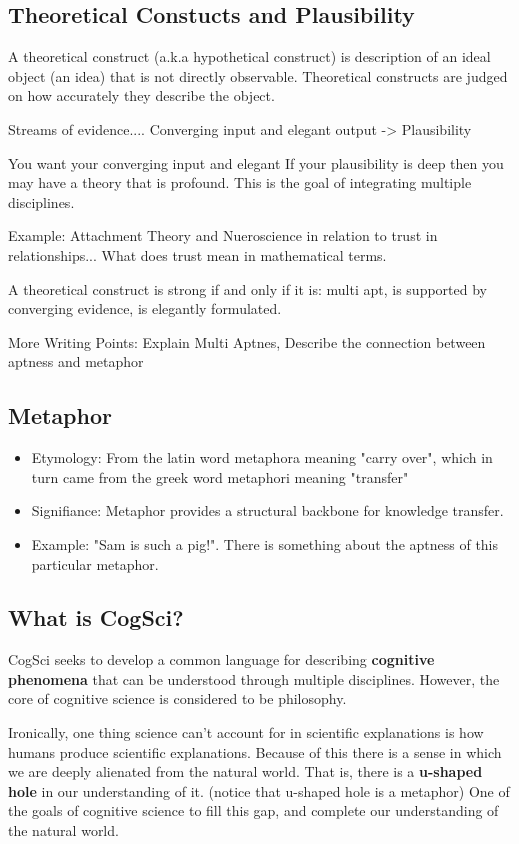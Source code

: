 \documentclass[twoside]{article}
\begin{document}
\subsection{Theoretical Constucts and Plausibility}

A theoretical construct (a.k.a hypothetical construct) is description of
an ideal object (an idea) that is not directly observable. Theoretical constructs
are judged on how accurately they describe the object.

Streams of evidence....
Converging input and elegant output -> Plausibility

You want your converging input and elegant
If your plausibility is deep then you may have a theory that is profound. This is
the goal of integrating multiple disciplines.

Example: Attachment Theory and Nueroscience in relation to trust in relationships...
What does trust mean in mathematical terms.

A theoretical construct is strong if and only if it is: multi apt, is supported by converging evidence, is
elegantly formulated.

More Writing Points: Explain Multi Aptnes, Describe the connection between aptness
and metaphor

\subsection{Metaphor}
\begin{itemize}
  \item Etymology: From the latin word metaphora meaning "carry over", which in turn
  came from the greek word metaphori meaning "transfer"
  \item Signifiance: Metaphor provides a structural backbone for knowledge transfer.
  \item Example: "Sam is such a pig!". There is something about the aptness
  of this particular metaphor.
\end{itemize}

\subsection{What is CogSci?}
CogSci seeks to develop a common language for describing \textbf{cognitive phenomena}
that can be understood through multiple disciplines. However, the core of cognitive
science is considered to be philosophy.

Ironically, one thing science can't account for in scientific explanations is how
humans produce scientific explanations. Because of this there is a sense in which we are deeply
alienated from the natural world. That is, there is a \textbf{u-shaped hole} in
our understanding of it. (notice that u-shaped hole is a metaphor) One of the goals
of cognitive science to fill this gap, and complete our understanding of the natural world.
\end{document}
